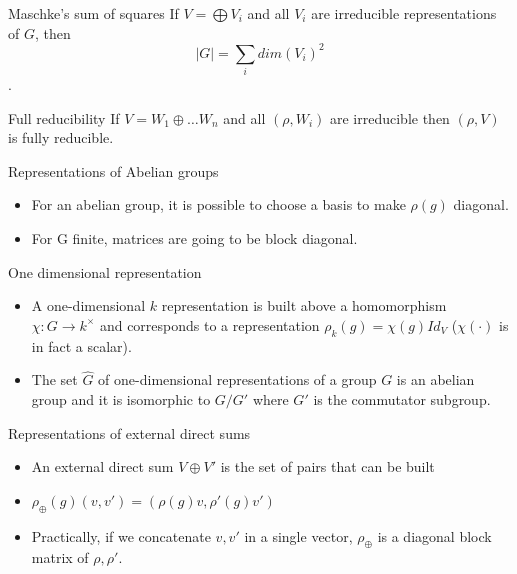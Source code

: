 \documentclass[presentation]{beamer}
\begin{document}
\begin{frame}[label={sec:orgf8f5eec}]{Maschke's sum of squares}
If \(V = \bigoplus V_i\) and all \(V_i\) are irreducible representations of \(G\),
then $$|G| = \sum_i dim(V_i)^2$$.
\end{frame}

\begin{frame}[label={sec:org1b5e501}]{Full reducibility}
If \(V = W_1 \oplus \ldots W_n\) and all \((\rho, W_i)\) are irreducible then
\((\rho, V)\) is fully reducible.
\end{frame}

\begin{frame}[label={sec:org07f6316}]{Representations of Abelian groups}
\begin{itemize}
\item For an abelian group, it is possible to choose a basis to make \(\rho(g)\) diagonal.

\item For G finite, matrices are going to be block diagonal.
\end{itemize}
\end{frame}

\begin{frame}[label={sec:org6a8037e}]{One dimensional representation}
\begin{itemize}
\item A one-dimensional \(k\) representation is built above a homomorphism \(\chi: G
    \rightarrow k^{\times}\) and corresponds to a representation \(\rho_k(g) =
    \chi(g)Id_{V}\) (\(\chi(\cdot)\) is in fact a scalar).

\item The set \(\hat{G}\) of one-dimensional representations of a group \(G\) is an
abelian group and it is isomorphic to \(G/G'\) where \(G'\) is the
commutator subgroup.
\end{itemize}
\end{frame}

\begin{frame}[label={sec:org911db71}]{Representations of external direct sums}
\begin{itemize}
\item An external direct sum \(V \oplus V'\) is the set of pairs that can be built

\item \(\rho_{\oplus}(g)(v,v') = (\rho(g)v, \rho'(g)v')\)

\item Practically, if we concatenate \(v,v'\) in a single vector, \(\rho_{\oplus}\)
is a diagonal block matrix of \(\rho, \rho'\).
\end{itemize}
\end{frame}
\end{document}
